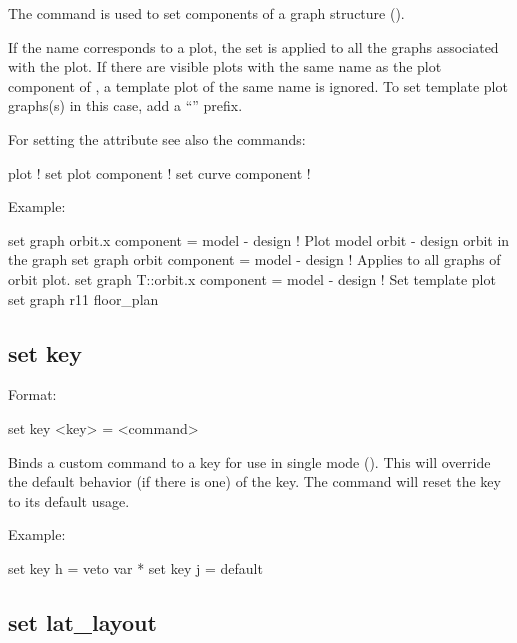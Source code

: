 {{The  command is used to set components of a graph structure ().

If the  name corresponds to a plot, the set is applied to all the graphs associated with
the plot. If there are visible plots with the same name as the plot component of , a
template plot of the same name is ignored. To set template plot graphs(s) in this case, add a
``'' prefix.

For setting the  attribute see also the commands:
\begin{example}
  plot                    ! 
  set plot component      ! 
  set curve component     ! 
\end{example}

Example:
\begin{example}
  set graph orbit.x component = model - design  
                                      ! Plot model orbit - design orbit in the graph
  set graph orbit component = model - design  ! Applies to all graphs of orbit plot.
  set graph T::orbit.x component = model - design  ! Set template plot
  set graph r11 floor_plan%
\end{example}


\subsection{set key}
\label{s:set.key}

Format:
\begin{example}
  set key <key> = <command>
\end{example}

Binds a custom command to a key for use in single mode ().  This will
override the default behavior (if there is one) of the key.  The command  will
reset the key to its default usage.

Example:
\begin{example}
  set key h = veto var *
  set key j = default
\end{example}



\subsection{set lat_layout}
\label{s:set.lat.layout}

}}
